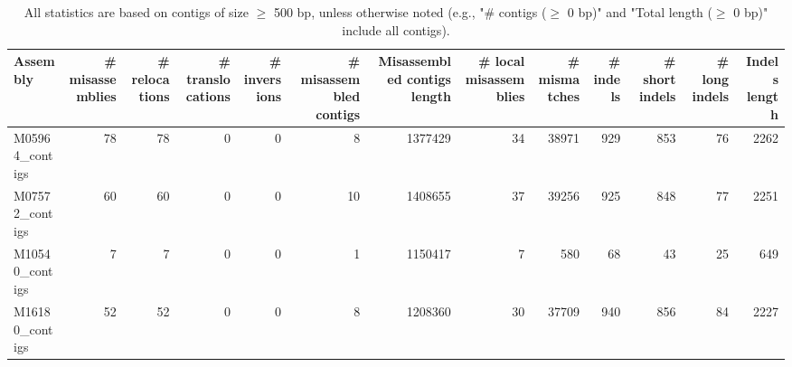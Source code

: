 \documentclass[12pt,a4paper]{article}
\begin{document}
\begin{table}[ht]
\begin{center}
\caption{All statistics are based on contigs of size $\geq$ 500 bp, unless otherwise noted (e.g., "\# contigs ($\geq$ 0 bp)" and "Total length ($\geq$ 0 bp)" include all contigs).}
\begin{tabular}{|l*{12}{|r}|}
\hline
Assembly & \# misassemblies &     \# relocations &     \# translocations &     \# inversions & \# misassembled contigs & Misassembled contigs length & \# local misassemblies & \# mismatches & \# indels &     \# short indels &     \# long indels & Indels length \\ \hline
M05964\_contigs & 78 & 78 & 0 & 0 & 8 & 1377429 & 34 & 38971 & 929 & 853 & 76 & 2262 \\ \hline
M07572\_contigs & 60 & 60 & 0 & 0 & 10 & 1408655 & 37 & 39256 & 925 & 848 & 77 & 2251 \\ \hline
M10540\_contigs & 7 & 7 & 0 & 0 & 1 & 1150417 & 7 & 580 & 68 & 43 & 25 & 649 \\ \hline
M16180\_contigs & 52 & 52 & 0 & 0 & 8 & 1208360 & 30 & 37709 & 940 & 856 & 84 & 2227 \\ \hline
\end{tabular}
\end{center}
\end{table}
\end{document}
